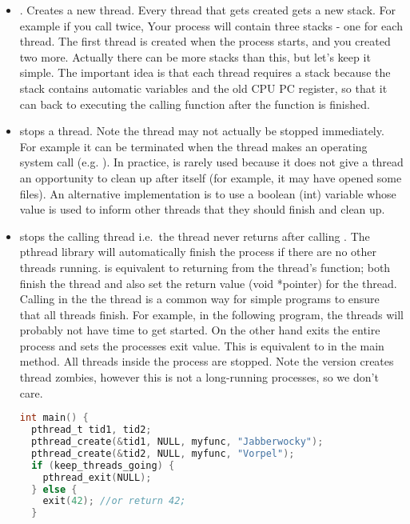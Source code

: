\begin{itemize}
\item {}. Creates a new thread. Every thread that gets created gets a new stack. For example if you call  twice, Your process will contain three stacks - one for each thread. The first thread is created when the process starts, and you created two more. Actually there can be more stacks than this, but let's keep it simple. The important idea is that each thread requires a stack because the stack contains automatic variables and the old CPU PC register, so that it can back to executing the calling function after the function is finished.
\item {} stops a thread. Note the thread may not actually be stopped immediately. For example it can be terminated when the thread makes an operating system call (e.g. ). In practice,  is rarely used because it does not give a thread an opportunity to clean up after itself (for example, it may have opened some files). An alternative implementation is to use a boolean (int) variable whose value is used to inform other threads that they should finish and clean up.
\item {} stops the calling thread i.e.~the thread never returns after calling . The pthread library will automatically finish the process if there are no other threads running.  is equivalent to returning from the thread's function; both finish the thread and also set the return value (void *pointer) for the thread. Calling  in the the  thread is a common way for simple programs to ensure that all threads finish. For example, in the following program, the  threads will probably not have time to get started. On the other hand  exits the entire process and sets the processes exit value. This is equivalent to  in the main method. All threads inside the process are stopped. Note the  version creates thread zombies, however this is not a long-running processes, so we don't care. 

\begin{lstlisting}[language=C]
int main() {
  pthread_t tid1, tid2;
  pthread_create(&tid1, NULL, myfunc, "Jabberwocky");
  pthread_create(&tid2, NULL, myfunc, "Vorpel");
  if (keep_threads_going) {
    pthread_exit(NULL); 
  } else {
    exit(42); //or return 42;
  }


\end{lstlisting}
\end{itemize}
